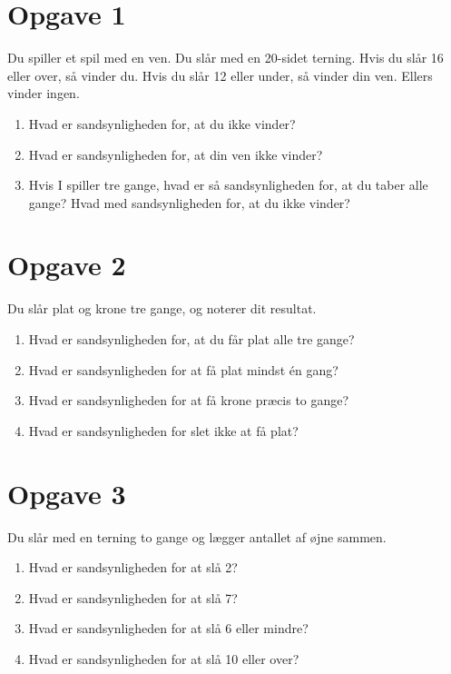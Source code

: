 \section*{Opgave 1}
Du spiller et spil med en ven. Du slår med en 20-sidet terning. Hvis du slår 16 eller over, så vinder du. Hvis du slår 12 eller under, så vinder din ven. Ellers vinder ingen.
\begin{enumerate}[label=\roman*)]
	\item Hvad er sandsynligheden for, at du ikke vinder?
	\item Hvad er sandsynligheden for, at din ven ikke vinder?
	\item Hvis I spiller tre gange, hvad er så sandsynligheden for, at du taber alle gange? Hvad med sandsynligheden for, at du ikke vinder?
\end{enumerate}

\section*{Opgave 2}
Du slår plat og krone tre gange, og noterer dit resultat.
\begin{enumerate}[label=\roman*)]
	\item Hvad er sandsynligheden for, at du får plat alle tre gange?
	\item Hvad er sandsynligheden for at få plat mindst én gang?
	\item Hvad er sandsynligheden for at få krone præcis to gange?
	\item Hvad er sandsynligheden for slet ikke at få plat?
\end{enumerate}

\section*{Opgave 3}
Du slår med en terning to gange og lægger antallet af øjne sammen. 
\begin{enumerate}[label=\roman*)]
	\item Hvad er sandsynligheden for at slå 2?
	\item Hvad er sandsynligheden for at slå 7?
	\item Hvad er sandsynligheden for at slå 6 eller mindre?
	\item Hvad er sandsynligheden for at slå 10 eller over?
\end{enumerate}

